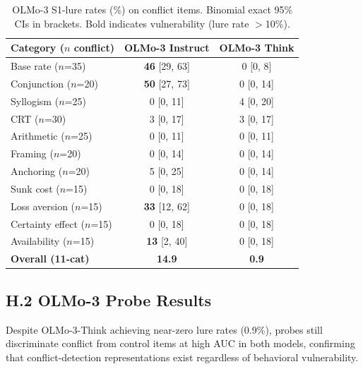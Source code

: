 \documentclass[accepted]{article}
\begin{document}
\begin{table}[ht]
\centering
\caption{OLMo-3 S1-lure rates (\%) on conflict items.
  Binomial exact 95\% CIs in brackets.  Bold indicates vulnerability
  (lure rate $>$10\%).}
\label{tab:olmo_behavioral}
\vspace{4pt}
\small
\begin{tabular}{lcc}
\toprule
\textbf{Category ($n$ conflict)} & \textbf{OLMo-3 Instruct} & \textbf{OLMo-3 Think} \\
\midrule
Base rate ($n$=35)       & \textbf{46} {\scriptsize [29, 63]} & 0 {\scriptsize [0, 8]}  \\
Conjunction ($n$=20)     & \textbf{50} {\scriptsize [27, 73]} & 0 {\scriptsize [0, 14]} \\
Syllogism ($n$=25)       & 0 {\scriptsize [0, 11]}            & 4 {\scriptsize [0, 20]} \\
CRT ($n$=30)             & 3 {\scriptsize [0, 17]}            & 3 {\scriptsize [0, 17]} \\
Arithmetic ($n$=25)      & 0 {\scriptsize [0, 11]}            & 0 {\scriptsize [0, 11]} \\
Framing ($n$=20)         & 0 {\scriptsize [0, 14]}            & 0 {\scriptsize [0, 14]} \\
Anchoring ($n$=20)       & 5 {\scriptsize [0, 25]}            & 0 {\scriptsize [0, 14]} \\
Sunk cost ($n$=15)       & 0 {\scriptsize [0, 18]}            & 0 {\scriptsize [0, 18]} \\
Loss aversion ($n$=15)   & \textbf{33} {\scriptsize [12, 62]} & 0 {\scriptsize [0, 18]} \\
Certainty effect ($n$=15)& 0 {\scriptsize [0, 18]}            & 0 {\scriptsize [0, 18]} \\
Availability ($n$=15)    & \textbf{13} {\scriptsize [2, 40]}  & 0 {\scriptsize [0, 18]} \\
\midrule
\textbf{Overall (11-cat)} & \textbf{14.9} & \textbf{0.9} \\
\bottomrule
\end{tabular}
\end{table}

\subsection*{H.2 OLMo-3 Probe Results}

Despite OLMo-3-Think achieving near-zero lure rates (0.9\%), probes
still discriminate conflict from control items at high AUC in both
models, confirming that conflict-detection representations exist
regardless of behavioral vulnerability.
\end{document}
